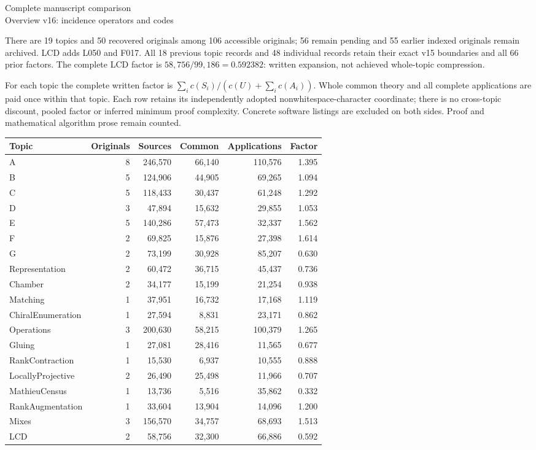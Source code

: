 \documentclass[11pt,a4paper]{article}
\begin{document}
\begin{center}{\Large Complete manuscript comparison}\\[3pt]
Overview v16: incidence operators and codes\end{center}
There are 19 topics and 50 recovered originals among 106 accessible originals; 56 remain pending and 55 earlier indexed originals remain archived. LCD adds L050 and F017. All 18 previous topic records and 48 individual records retain their exact v15 boundaries and all 66 prior factors. The complete LCD factor is $58,756/99,186=0.592382$: written expansion, not achieved whole-topic compression.

For each topic the complete written factor is $\sum_i c(S_i)/(c(U)+\sum_i c(A_i))$. Whole common theory and all complete applications are paid once within that topic. Each row retains its independently adopted nonwhitespace-character coordinate; there is no cross-topic discount, pooled factor or inferred minimum proof complexity. Concrete software listings are excluded on both sides. Proof and mathematical algorithm prose remain counted.
\begin{center}\small\begin{tabular}{lrrrrr}\toprule
Topic & Originals & Sources & Common & Applications & Factor\\\midrule
A & 8 & 246,570 & 66,140 & 110,576 & 1.395 \\
B & 5 & 124,906 & 44,905 & 69,265 & 1.094 \\
C & 5 & 118,433 & 30,437 & 61,248 & 1.292 \\
D & 3 & 47,894 & 15,632 & 29,855 & 1.053 \\
E & 5 & 140,286 & 57,473 & 32,337 & 1.562 \\
F & 2 & 69,825 & 15,876 & 27,398 & 1.614 \\
G & 2 & 73,199 & 30,928 & 85,207 & 0.630 \\
Representation & 2 & 60,472 & 36,715 & 45,437 & 0.736 \\
Chamber & 2 & 34,177 & 15,199 & 21,254 & 0.938 \\
Matching & 1 & 37,951 & 16,732 & 17,168 & 1.119 \\
ChiralEnumeration & 1 & 27,594 & 8,831 & 23,171 & 0.862 \\
Operations & 3 & 200,630 & 58,215 & 100,379 & 1.265 \\
Gluing & 1 & 27,081 & 28,416 & 11,565 & 0.677 \\
RankContraction & 1 & 15,530 & 6,937 & 10,555 & 0.888 \\
LocallyProjective & 2 & 26,490 & 25,498 & 11,966 & 0.707 \\
MathieuCensus & 1 & 13,736 & 5,516 & 35,862 & 0.332 \\
RankAugmentation & 1 & 33,604 & 13,904 & 14,096 & 1.200 \\
Mixes & 3 & 156,570 & 34,757 & 68,693 & 1.513 \\
LCD & 2 & 58,756 & 32,300 & 66,886 & 0.592 \\
\bottomrule\end{tabular}\end{center}
\end{document}
